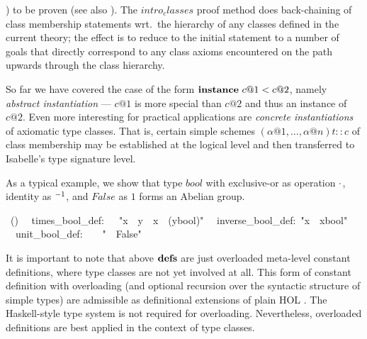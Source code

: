 \begin{isabelle}
\begin{isamarkuptext}
 ) to be proven
 (see also \cite{isabelle-isar-ref}).  The $intro_classes$ proof
 method does back-chaining of class membership statements wrt.\ the
 hierarchy of any classes defined in the current theory; the effect is
 to reduce to the initial statement to a number of goals that directly
 correspond to any class axioms encountered on the path upwards
 through the class hierarchy.%
\end{isamarkuptext}%
%
%
\begin{isamarkuptext}%
So far we have covered the case of the form
 $\emph{\bf instance}~c@1 < c@2$, namely \emph{abstract
 instantiation} --- $c@1$ is more special than $c@2$ and thus an
 instance of $c@2$.  Even more interesting for practical applications
 are \emph{concrete instantiations} of axiomatic type classes.  That
 is, certain simple schemes $(\alpha@1, \ldots, \alpha@n)t :: c$ of
 class membership may be established at the logical level and then
 transferred to Isabelle's type signature level.

 \medskip As a typical example, we show that type $bool$ with
 exclusive-or as operation $\cdot$, identity as $\emph{${}^{-1}$}$, and
 $False$ as $1$ forms an Abelian group.%
\end{isamarkuptext}%
~()\isanewline
~~times\_bool\_def:~~~{"}x~{\isasymOtimes}~y~{\isasymequiv}~x~{\isasymnoteq}~(y{\isasymColon}bool){"}\isanewline
~~inverse\_bool\_def:~{"}x{\isasyminv}~{\isasymequiv}~x{\isasymColon}bool{"}\isanewline
~~unit\_bool\_def:~~~~{"}{\isasymunit}~{\isasymequiv}~False{"}%
\begin{isamarkuptext}%
\medskip It is important to note that above ${\mathord{\mathbf{defs}}}$ are just
 overloaded meta-level constant definitions, where type classes are
 not yet involved at all.  This form of constant definition with
 overloading (and optional recursion over the syntactic structure of
 simple types) are admissible as definitional extensions of plain HOL
 \cite{Wenzel:1997:TPHOL}.  The Haskell-style type system is not
 required for overloading.  Nevertheless, overloaded definitions are
 best applied in the context of type classes.


\end{isamarkuptext}
\end{isabelle}
